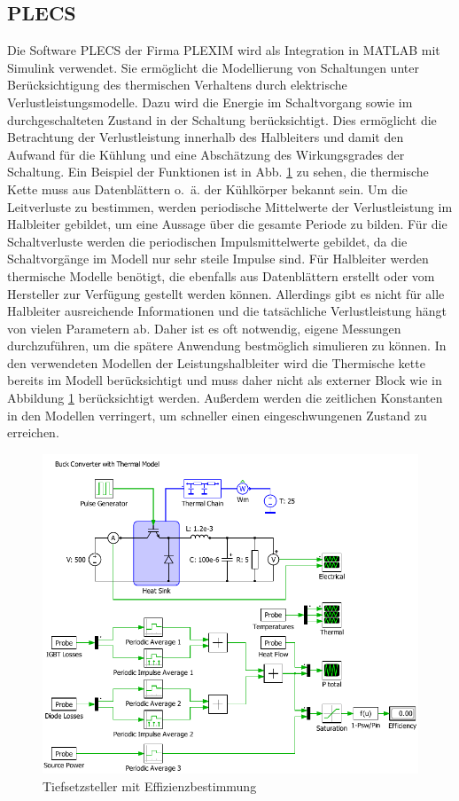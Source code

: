 	\subsection{PLECS}
	Die Software \gls{PLECS} der Firma PLEXIM wird als Integration in MATLAB mit Simulink verwendet.  Sie ermöglicht die Modellierung von Schaltungen unter Berücksichtigung des thermischen Verhaltens durch elektrische Verlustleistungsmodelle. Dazu wird die Energie im Schaltvorgang sowie im durchgeschalteten Zustand in der Schaltung berücksichtigt. Dies ermöglicht die Betrachtung der Verlustleistung innerhalb des Halbleiters und damit den Aufwand für die Kühlung und eine Abschätzung des Wirkungsgrades der Schaltung. Ein Beispiel der Funktionen ist in Abb. \ref{fig:plecsbuck} zu sehen, die thermische Kette muss aus Datenblättern o.~ä. der Kühlkörper bekannt sein. Um die Leitverluste zu bestimmen, werden periodische Mittelwerte der Verlustleistung im Halbleiter gebildet, um eine Aussage über die gesamte Periode zu bilden. Für die Schaltverluste werden die periodischen Impulsmittelwerte gebildet, da die Schaltvorgänge im Modell nur sehr steile Impulse sind. Für Halbleiter werden thermische Modelle benötigt, die ebenfalls aus Datenblättern erstellt oder vom Hersteller zur Verfügung gestellt werden können. Allerdings gibt es nicht für alle Halbleiter ausreichende Informationen und die tatsächliche Verlustleistung hängt von vielen Parametern ab. Daher ist es oft notwendig, eigene Messungen durchzuführen, um die spätere Anwendung bestmöglich simulieren zu können. In den verwendeten Modellen der Leistungshalbleiter wird die Thermische kette bereits im Modell berücksichtigt und muss daher nicht als externer Block wie in Abbildung \ref{fig:plecsbuck} berücksichtigt werden. Außerdem werden die zeitlichen Konstanten in den Modellen verringert, um schneller einen eingeschwungenen Zustand zu erreichen. \\
	
	\begin{figure}
		\centering
		\includegraphics[width=1\linewidth]{content/Grafiken/PLECS_Buck}
		\caption[Tiefsetzsteller mit Effizienzbestimmung]{Tiefsetzsteller mit Effizienzbestimmung}
		\label{fig:plecsbuck}
	\end{figure}
	